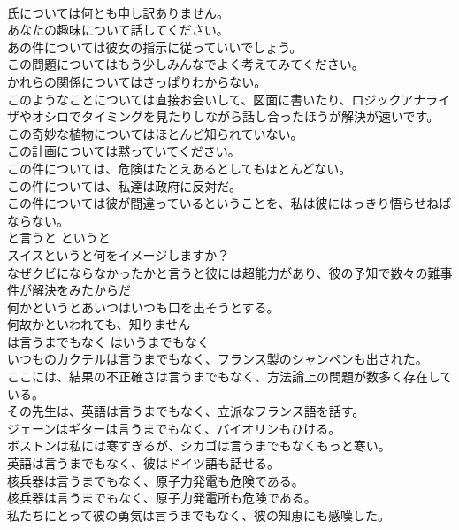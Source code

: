 \documentclass[8pt]{extreport}
\begin{document}
\begin{CJK}{UTF8}{min}
\\	氏については何とも申し訳ありません。  
\\	あなたの趣味について話してください。   
\\	あの件については彼女の指示に従っていいでしょう。   
\\	この問題についてはもう少しみんなでよく考えてみてください。  
\\	かれらの関係についてはさっぱりわからない。   
\\	このようなことについては直接お会いして、図面に書いたり、ロジックアナライザやオシロでタイミングを見たりしながら話し合ったほうが解決が速いです。   
\\	この奇妙な植物についてはほとんど知られていない。  
\\	この計画については黙っていてください。   
\\	この件については、危険はたとえあるとしてもほとんどない。   
\\	この件については、私達は政府に反対だ。   
\\	この件については彼が間違っているということを、私は彼にはっきり悟らせねばならない。   
\\	と言うと	というと	
\\	スイスというと何をイメージしますか？  
\\	なぜクビにならなかったかと言うと彼には超能力があり、彼の予知で数々の難事件が解決をみたからだ  
\\	何かというとあいつはいつも口を出そうとする。  
\\	何故かといわれても、知りません  
\\	は言うまでもなく	はいうまでもなく	
\\	いつものカクテルは言うまでもなく、フランス製のシャンペンも出された。   
\\	ここには、結果の不正確さは言うまでもなく、方法論上の問題が数多く存在している。   
\\	その先生は、英語は言うまでもなく、立派なフランス語を話す。   
\\	ジェーンはギターは言うまでもなく、バイオリンもひける。   
\\	ボストンは私には寒すぎるが、シカゴは言うまでもなくもっと寒い。   
\\	英語は言うまでもなく、彼はドイツ語も話せる。   
\\	核兵器は言うまでもなく、原子力発電も危険である。   
\\	核兵器は言うまでもなく、原子力発電所も危険である。   
\\	私たちにとって彼の勇気は言うまでもなく、彼の知恵にも感嘆した。   

\end{CJK}
\end{document}
